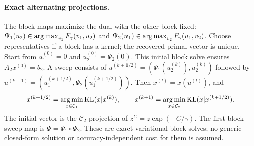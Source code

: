 \paragraph{Exact alternating projections.}\label{subsec:cyclic}
The block maps maximize the dual with the other block fixed: $\Psi_1(u_2)\in\mathop{\mathrm{arg\,max}}_{v_1}F_\gamma(v_1,u_2)$ and $\Psi_2(u_1)\in\mathop{\mathrm{arg\,max}}_{v_2}F_\gamma(u_1,v_2)$. Choose representatives if a block has a kernel; the recovered primal vector is unique. Start from $u_1^{(0)}=0$ and $u_2^{(0)}=\Psi_2(0)$. This initial block solve ensures $A_2x^{(0)}=b_2$. A sweep consists of $u^{(k+1/2)}=(\Psi_1(u_2^{(k)}),u_2^{(k)})$ followed by $u^{(k+1)}=(u_1^{(k+1/2)},\Psi_2(u_1^{(k+1/2)}))$. Then $x^{(t)}=x(u^{(t)})$, and
\begin{equation}\label{eq:KL-primal}
 x^{(k+1/2)}=\mathop{\mathrm{arg\,min}}_{x\in\mathcal C_1}\mathrm{KL}(x|x^{(k)}),\qquad
 x^{(k+1)}=\mathop{\mathrm{arg\,min}}_{x\in\mathcal C_2}\mathrm{KL}(x|x^{(k+1/2)}).
\end{equation}
The initial vector is the $\mathcal C_2$ projection of $z^C=z\exp(-C/\gamma)$. The first-block sweep map is $\Psi=\Psi_1\circ\Psi_2$. These are exact variational block solves; no generic closed-form solution or accuracy-independent cost for them is assumed.
